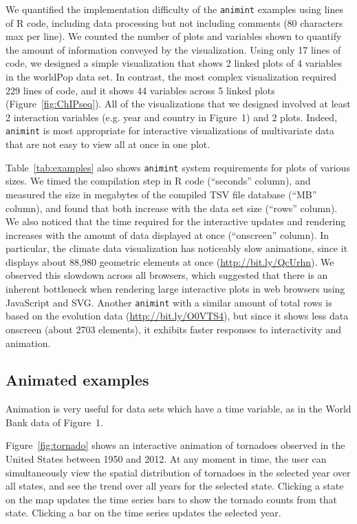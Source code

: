 \documentclass[journal]{vgtc}\usepackage[]{graphicx}\usepackage[]{color}
\begin{document}
We quantified the implementation difficulty of the \texttt{animint} examples
using lines of R code, including data processing but not including
comments (80 characters max per line). We counted the number of plots
and variables shown to quantify the amount of information conveyed by
the visualization. Using only 17 lines of code, we designed a simple
visualization that shows 2 linked plots of 4 variables in the worldPop
data set. In contrast, the most complex visualization required 229
lines of code, and it shows 44 variables across 5 linked plots
(Figure~\ref{fig:ChIPseq}). All of the visualizations that we designed
involved at least 2 interaction variables (e.g. year and country in
Figure~1) and 2 plots. Indeed, \texttt{animint} is most appropriate for
interactive visualizations of multivariate data that are not easy to
view all at once in one plot.

Table~\ref{tab:examples} also shows \texttt{animint} system requirements for
plots of various sizes. We timed the compilation step in R code
(``seconds'' column), and measured the size in megabytes of the
compiled TSV file database (``MB'' column), and found that both
increase with the data set size (``rows'' column).
We also noticed that the time required for the interactive updates and
rendering increases with the amount of data displayed at once
(``onscreen'' column). In particular, the climate data visualization
has noticeably slow animations, since it displays about 88,980
geometric elements at once (\url{http://bit.ly/QcUrhn}). We observed
this slowdown across all browsers, which suggested that there is an
inherent bottleneck when rendering large interactive plots in web
browsers using JavaScript and SVG. Another \texttt{animint} with a similar
amount of total rows is based on the evolution data
(\url{http://bit.ly/O0VTS4}), but since it shows less data onscreen
(about 2703 elements), it exhibits faster responses to interactivity
and animation.

\subsection{Animated examples}

Animation is very useful for data sets which have a time variable,
as in the World Bank data of Figure~1.

Figure~\ref{fig:tornado} shows an interactive animation of tornadoes
observed in the United States between 1950 and 2012. At any moment in
time, the user can simultaneously view the spatial distribution of
tornadoes in the selected year over all states, and see the trend over
all years for the selected state. Clicking a state on the map updates the
time series bars to show the tornado counts from that state. Clicking
a bar on the time series updates the selected year.
\end{document}
